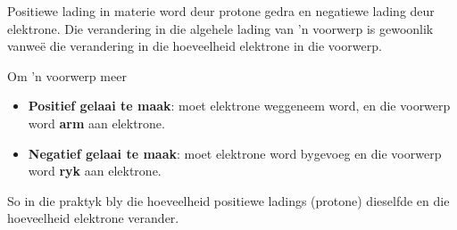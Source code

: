 \par 

Positiewe lading in materie word deur protone gedra en negatiewe lading deur elektrone. Die verandering in die algehele lading van 'n voorwerp is gewoonlik vanwe\"e die verandering in die hoeveelheid elektrone in die voorwerp.

Om 'n voorwerp meer
      \begin{itemize}
        \item \textbf{Positief gelaai te maak}: moet elektrone weggeneem word, en die voorwerp word \textbf{arm} aan elektrone.
        \item \textbf{Negatief gelaai te maak}: moet elektrone word bygevoeg en die voorwerp word \textbf{ryk} aan elektrone.
      \end{itemize}

So in die praktyk bly die hoeveelheid positiewe ladings (protone) dieselfde en die hoeveelheid elektrone verander.

